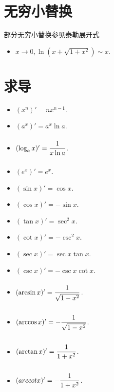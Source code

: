 \documentclass[a4paper,12pt,oneside,fontset=none]{ctexbook}
\let\olddfrac\dfrac
\renewcommand{\dfrac}[2]{
    \olddfrac{#1\vrule width 0pt height 1.15em depth 0em}{#2\vrule width 0pt height 0em depth 0.6em}
}
\numberwithin{equation}{chapter}
\begin{document}
\section{无穷小替换}
部分无穷小替换参见泰勒展开式
\begin{itemize}
    \item $x\rightarrow 0, \ln(x + \sqrt{1+x^2}) \sim x$.
\end{itemize}


\section{求导}
\begin{itemize}
    \item $(x^n)' = nx^{n-1}$.
    \item $(a^x)' = a^x \ln a$.
    \item $(\log_a x)' = \dfrac{1}{x \ln a}$.
    \item $(e^x)' = e^x$.
    \item $(\sin x)' = \cos x$.
    \item $(\cos x)' = -\sin x$.
    \item $(\tan x)' = \sec^2 x$.
    \item $(\cot x)' = -\csc^2 x$.
    \item $(\sec x)' = \sec x \tan x$.
    \item $(\csc x)' = -\csc x \cot x$.
    \item $(\arcsin x)' = \dfrac{1}{\sqrt{1 - x^2}}$.
    \item $(\arccos x)' = -\dfrac{1}{\sqrt{1 - x^2}}$.
    \item $(\arctan x)' = \dfrac{1}{1 + x^2}$.
    \item $(arccot x)' = -\dfrac{1}{1 + x^2}$.
    
\end{itemize}
\end{document}
